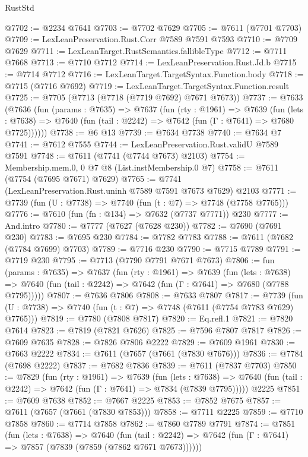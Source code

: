\begin{lexlean}{RustStd}
\begin{coremodule}
@7702 := @2234 @7641
@7703 := @7702 @7629
@7705 := @7611 (@7701 @7703)
@7709 := LexLeanPreservation.Rust.Corr @7589 @7591 @7593
@7710 := @7709 @7629
@7711 := LexLeanTarget.RustSemantics.fallibleType
@7712 := @7711 @7668
@7713 := @7710 @7712
@7714 := LexLeanPreservation.Rust.Jd.b
@7715 := @7714 @7712
@7716 := LexLeanTarget.TargetSyntax.Function.body
@7718 := @7715 (@7716 @7692)
@7719 := LexLeanTarget.TargetSyntax.Function.result
@7725 := @7705 (@7713 (@7718 (@7719 @7692) @7671 @7673))
@7737 := @7633
    (@7636
      (fun (params : @7635) =>
      @7637
        (fun (rty : @1961) =>
        @7639
          (fun (lets : @7638) =>
          @7640 (fun (tail : @2242) => @7642 (fun (Γ : @7641) => @7680 @7725))))))
@7738 := @6 @13
@7739 := @7634 @7738
@7740 := @7634 @7
@7741 := @7612 @7555
@7744 := LexLeanPreservation.Rust.validU @7589 @7591
@7748 := @7611 (@7741 (@7744 @7673) @2103)
@7754 := Membership.mem.{0, 0} @7 @8 (List.instMembership.{0} @7)
@7758 := @7611 (@7754 (@7695 @7671) @7629)
@7765 := @7741 (LexLeanPreservation.Rust.uninh @7589 @7591 @7673 @7629) @2103
@7771 := @7739 (fun (U : @7738) => @7740 (fun (t : @7) => @7748 (@7758 @7765)))
@7776 := @7610 (fun (fn : @134) => @7632 (@7737 @7771)) @230
@7777 := And.intro
@7780 := @7777 (@7627 (@7628 @230))
@7782 := @7690 (@7691 @230)
@7783 := @7695 @230
@7784 := @7782 @7783
@7788 := @7611 (@7682 (@7784 @7699) @7703)
@7789 := @7716 @230
@7790 := @7715 @7789
@7791 := @7719 @230
@7795 := @7713 (@7790 @7791 @7671 @7673)
@7806 := fun (params : @7635) =>
  @7637
    (fun (rty : @1961) =>
    @7639
      (fun (lets : @7638) =>
      @7640 (fun (tail : @2242) => @7642 (fun (Γ : @7641) => @7680 (@7788 @7795)))))
@7807 := @7636 @7806
@7808 := @7633 @7807
@7817 := @7739 (fun (U : @7738) => @7740 (fun (t : @7) => @7748 (@7611 (@7754 @7783 @7629) @7765)))
@7819 := @7780 (@7808 @7817)
@7820 := Eq.refl.{1}
@7821 := @7820 @7614
@7823 := @7819 (@7821 @7626)
@7825 := @7596 @7807 @7817
@7826 := @7609 @7635
@7828 := @7826 @7806 @2222
@7829 := @7609 @1961
@7830 := @7663 @2222
@7834 := @7611 (@7657 (@7661 (@7830 @7676)))
@7836 := @7784 (@7698 @2222)
@7837 := @7682 @7836
@7839 := @7611 (@7837 @7703)
@7850 := @7829
    (fun (rty : @1961) =>
    @7639
      (fun (lets : @7638) =>
      @7640 (fun (tail : @2242) => @7642 (fun (Γ : @7641) => @7834 (@7839 @7795)))))
    @2225
@7851 := @7609 @7638
@7852 := @7667 @2225
@7853 := @7852 @7675
@7857 := @7611 (@7657 (@7661 (@7830 @7853)))
@7858 := @7711 @2225
@7859 := @7710 @7858
@7860 := @7714 @7858
@7862 := @7860 @7789 @7791
@7874 := @7851
    (fun (lets : @7638) =>
    @7640
      (fun (tail : @2242) => @7642 (fun (Γ : @7641) => @7857 (@7839 (@7859 (@7862 @7671 @7673))))))

\end{coremodule}
\end{lexlean}
